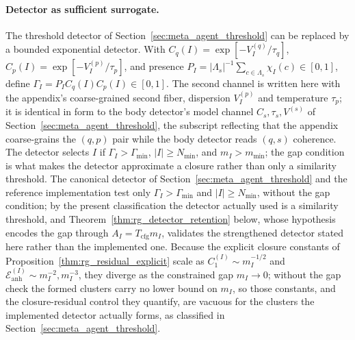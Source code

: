 \documentclass[11pt]{article}
\begin{document}
\paragraph{Detector as sufficient surrogate.}
The threshold detector of Section~\ref{sec:meta_agent_threshold} can be replaced by a bounded exponential detector. With $C_q(I) = \exp[-V_I^{(q)}/\tau_q]$, $C_p(I) = \exp[-V_I^{(p)}/\tau_p]$, and presence $P_I = |\Lambda_s|^{-1}\sum_{c \in \Lambda_s}\chi_I(c) \in [0, 1]$, define $\Gamma_I = P_I C_q(I) C_p(I) \in [0, 1]$. The second channel is written here with the appendix's coarse-grained second fiber, dispersion $V_I^{(p)}$ and temperature $\tau_p$; it is identical in form to the body detector's model channel $C_s, \tau_s, V^{(s)}$ of Section~\ref{sec:meta_agent_threshold}, the subscript reflecting that the appendix coarse-grains the $(q,p)$ pair while the body detector reads $(q,s)$ coherence. The detector selects $I$ if $\Gamma_I > \Gamma_{\min}$, $|I| \ge N_{\min}$, and $m_I > m_{\min}$; the gap condition is what makes the detector approximate a closure rather than only a similarity threshold. The canonical detector of Section~\ref{sec:meta_agent_threshold} and the reference implementation test only $\Gamma_I > \Gamma_{\min}$ and $|I| \ge N_{\min}$, without the gap condition; by the present classification the detector actually used is a similarity threshold, and Theorem~\ref{thm:rg_detector_retention} below, whose hypothesis encodes the gap through $A_I = T_{\mathrm{cfg}}m_I$, validates the strengthened detector stated here rather than the implemented one. Because the explicit closure constants of Proposition~\ref{thm:rg_residual_explicit} scale as $C_1^{(I)} \sim m_I^{-1/2}$ and $\mathcal{E}_{\mathrm{anh}}^{(I)} \sim m_I^{-2}, m_I^{-3}$, they diverge as the constrained gap $m_I \to 0$; without the gap check the formed clusters carry no lower bound on $m_I$, so those constants, and the closure-residual control they quantify, are vacuous for the clusters the implemented detector actually forms, as classified in Section~\ref{sec:meta_agent_threshold}.
\end{document}

